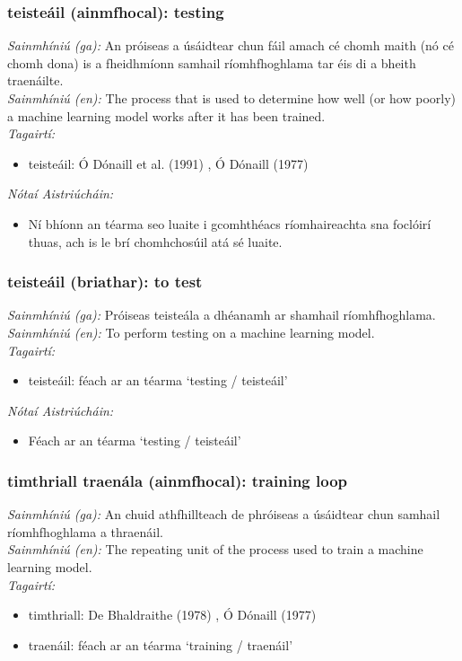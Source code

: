 \subsubsection*{teisteáil (ainmfhocal): testing}
 \noindent \textit{Sainmhíniú (ga):} An próiseas a úsáidtear chun fáil amach cé chomh maith (nó cé chomh dona) is a fheidhmíonn samhail ríomhfhoghlama tar éis di a bheith traenáilte.
\\
 \noindent \textit{Sainmhíniú (en):} The process that is used to determine how well (or how poorly) a machine learning model works after it has been trained.
\\
 \noindent \textit{Tagairtí:}
\begin{itemize}
	\item teisteáil: Ó Dónaill et al. (1991) \cite{focloir-beag}, Ó Dónaill (1977) \cite{odonaill}
\end{itemize}

 \noindent \textit{Nótaí Aistriúcháin:}
\begin{itemize}
	\item Ní bhíonn an téarma seo luaite i gcomhthéacs ríomhaireachta sna foclóirí thuas, ach is le brí chomhchosúil atá sé luaite.
\end{itemize}


\subsubsection*{teisteáil (briathar): to test}
 \noindent \textit{Sainmhíniú (ga):} Próiseas teisteála a dhéanamh ar shamhail ríomhfhoghlama.
\\
 \noindent \textit{Sainmhíniú (en):} To perform testing on a machine learning model.
\\
 \noindent \textit{Tagairtí:}
\begin{itemize}
	\item teisteáil: féach ar an téarma `testing / teisteáil'
\end{itemize}

 \noindent \textit{Nótaí Aistriúcháin:}
\begin{itemize}
	\item Féach ar an téarma `testing / teisteáil'
\end{itemize}


\subsubsection*{timthriall traenála (ainmfhocal): training loop}
 \noindent \textit{Sainmhíniú (ga):} An chuid athfhillteach de phróiseas a úsáidtear chun samhail ríomhfhoghlama a thraenáil.
\\
 \noindent \textit{Sainmhíniú (en):} The repeating unit of the process used to train a machine learning model.
\\
 \noindent \textit{Tagairtí:}
\begin{itemize}
	\item timthriall: De Bhaldraithe (1978) \cite{de-bhaldraithe}, Ó Dónaill (1977) \cite{odonaill}
	\item traenáil: féach ar an téarma `training / traenáil'
\end{itemize}

